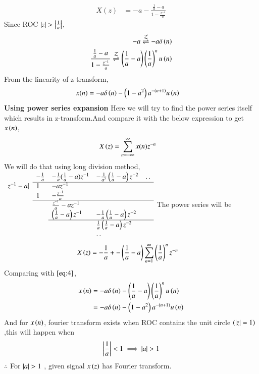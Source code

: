 \documentclass[journal,12pt,twocolumn]{IEEEtran}
\begin{document}
     \begin{align}
       X(z) &=  -a - \frac{\frac{1}{a} - a}{1 - \frac{z^{-1}}{a}}
     \end{align}
    Since ROC $\left\vert z\right\vert > \left\vert\frac{1}{a}\right\vert$,
     \begin{align}
         -a \overset{\mathcal{Z}}{ \rightleftharpoons} -a\delta\left(n\right)\\
         \frac{\frac{1}{a} - a}{1 - \frac{z^{-1}}{a}} \overset{\mathcal{Z}}{ \rightleftharpoons} \left(\frac{1}{a} - a\right)\left(\frac{1}{a}\right)^nu\left(n\right)\\
     \end{align}
     From the linearity of z-transform,
     \begin{align}
       x(n) &= -a\delta\left(n\right) -\left(1-a^2\right)a^{-\left(n+1\right)}u\left(n\right)
     \end{align}
    \textbf{Using power series expansion} Here we will try to find the power series itself which results in z-transform.And compare it with the below expression to get $x\left(n\right)$,
      \begin{align}
        X\left(z\right) &= \sum_{n=-\infty}^{\infty}x(n)z^{-n}\label{eq:4}
      \end{align}
    We will do that using long division method,\\
    $\begin{array}{llllll}
      & -\frac{1}{a} & -\frac{1}{a}(\frac{1}{a}-a)z^{-1}&-\frac{1}{a^2}\brak{\frac{1}{a}-a}z^{-2}&.\,. \\\cline{2-5}
      z^{-1} - a| & 1& -az^{-1}  \\
      & 1 & -\frac{z^{-1}}{a}  \\\cline{2-5}
      & & \frac{z^{-1}}{a} -az^{-1}& \\
      & & \brak{\frac{1}{a}-a}z^{-1} & -\frac{1}{a}\brak{\frac{1}{a}-a}z^{-2} & \\\cline{3-5}
      & & & \frac{1}{a}\brak{\frac{1}{a} - a}z^{-2} \\
      & & & .\,.
      \end{array}$
     The power series will be
      \begin{align}
        X\left(z\right) &= -\frac{1}{a}+ -\left(\frac{1}{a} - a\right)\sum_{n=1}^{\infty}\left(\frac{1}{a}\right)^{n}z^{-n}
      \end{align}         
      Comparing with $\eqref{eq:4}$,
       \begin{align}
         x\left(n\right) &= -a\delta\left(n\right) - \left(\frac{1}{a} - a\right)\left(\frac{1}{a}\right)^nu\left(n\right) \\
                   &=  -a\delta\left(n\right) -\left(1-a^2\right)a^{-\left(n+1\right)}u\left(n\right)
       \end{align}
      And for $x\left(n\right)$, fourier transform exists when ROC contains the unit circle $\left(\left\vert z\right\vert = 1\right)$,this will happen when 
      \begin{align}
         \left\vert\frac{1}{a}\right\vert < 1
         \implies \left\vert a\right\vert > 1
      \end{align}
      $\therefore$ For $\left\vert a\right\vert > 1$ , given signal $x\left(z\right)$ has Fourier transform.  
      
\end{document}
